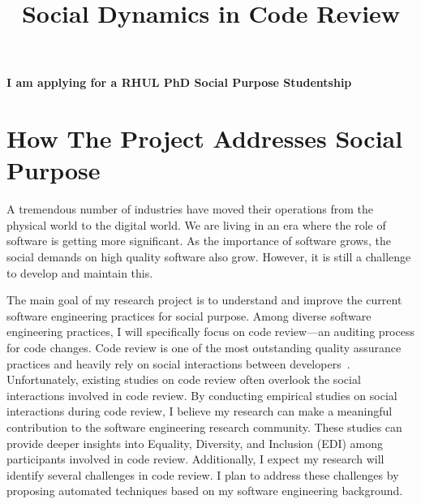 \documentclass[letterpaper]{article}
\title{Social Dynamics in Code Review}
\author{\name}
\date{}
\begin{document}
\begingroup
\noindent
{\bf I am applying for a RHUL PhD Social Purpose Studentship}
\let\newpage\relax%
\maketitle
\endgroup

\thispagestyle{fancy}


\section{How The Project Addresses Social Purpose}
A tremendous number of industries have moved their operations from the physical world to the digital world.
We are living in an era where the role of software is getting more significant.
As the importance of software grows, the social demands on high quality software also grow.
However, it is still a challenge to develop and maintain this.

The main goal of my research project is to understand and improve the current software engineering practices for social purpose.
Among diverse software engineering practices, I will specifically focus on code review---an auditing process for code changes.
Code review is one of the most outstanding quality assurance practices and heavily rely on social interactions between developers~\cite{Bosu17,Toufique17}.
Unfortunately, existing studies on code review often overlook the social interactions involved in code review.
By conducting empirical studies on social interactions during code review, I believe my research can make a meaningful contribution to the software engineering research community.
These studies can provide deeper insights into Equality, Diversity, and Inclusion (EDI) among participants involved in code review.
Additionally, I expect my research will identify several challenges in code review.
I plan to address these challenges by proposing automated techniques based on my software engineering background.

\end{document}
